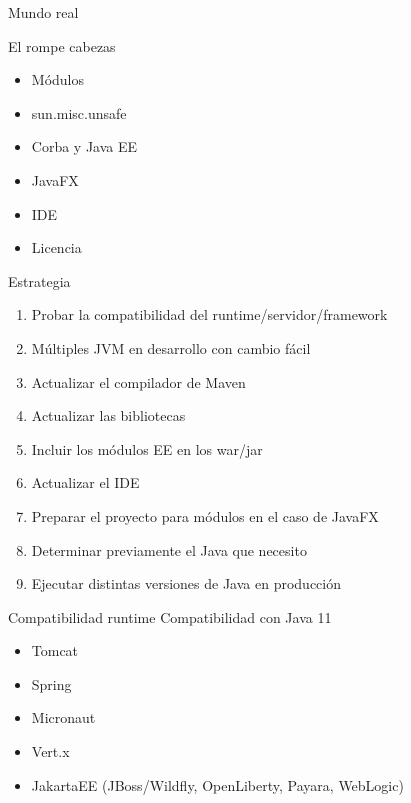 \documentclass[aspectratio=169]{beamer}
\begin{document}
\begin{frame}[fragile]{Mundo real}\scriptsize

    El rompe cabezas
    \begin{itemize}
        \item Módulos
        \item sun.misc.unsafe
        \item Corba y Java EE
        \item JavaFX
        \item IDE
        \item Licencia
    \end{itemize}
    
    Estrategia
    \begin{enumerate}
        \item Probar la compatibilidad del runtime/servidor/framework
        \item Múltiples JVM en desarrollo con cambio fácil
        \item Actualizar el compilador de Maven
        \item Actualizar las bibliotecas
        \item Incluir los módulos EE en los war/jar
        \item Actualizar el IDE
        \item Preparar el proyecto para módulos en el caso de JavaFX
        \item Determinar previamente el Java que necesito
        \item Ejecutar distintas versiones de Java en producción
    \end{enumerate}
\end{frame}

\begin{frame}[fragile]{Compatibilidad runtime}
    Compatibilidad con Java 11
    \begin{itemize}
        \item Tomcat
        \item Spring
        \item Micronaut
        \item Vert.x
        \item JakartaEE (JBoss/Wildfly, OpenLiberty, Payara, WebLogic)
    \end{itemize}
\end{frame}
\end{document}
